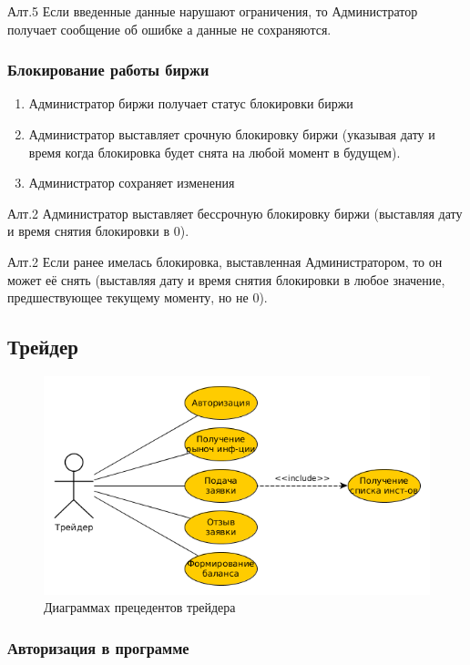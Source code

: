\documentclass[a4paper, 12pt]{article}        %
\begin{document}
Алт.5 Если введенные данные нарушают ограничения, то Администратор получает сообщение об ошибке а данные не сохраняются.

\subsubsection{Блокирование работы биржи}

\begin{enumerate}
\item Администратор биржи получает статус блокировки биржи
\item Администратор выставляет срочную блокировку биржи (указывая дату и время когда блокировка будет снята на любой момент в будущем).
\item Администратор сохраняет изменения
\end{enumerate}

Алт.2 Администратор выставляет бессрочную блокировку биржи (выставляя дату и время снятия блокировки в 0).

Алт.2 Если ранее имелась блокировка, выставленная Администратором, то он может её снять (выставляя дату и время снятия блокировки в любое значение, предшествующее текущему моменту, но не 0).

\subsection{Трейдер}

\begin{figure}[H]
\centering
\includegraphics[scale=0.8]{res/pic02}
\caption{Диаграммах прецедентов трейдера}
\end{figure}

\subsubsection{Авторизация в программе}
\end{document}
